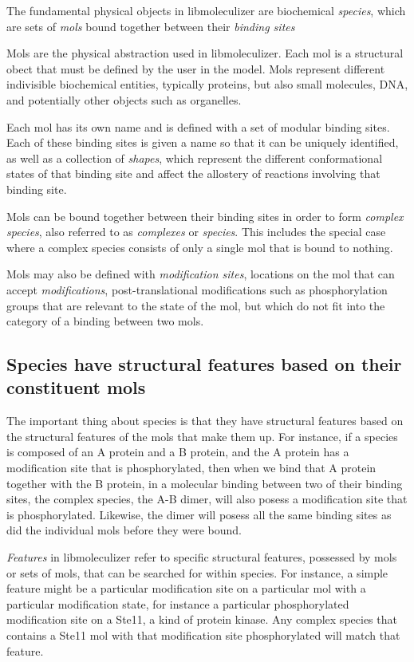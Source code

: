 The fundamental physical objects in libmoleculizer are biochemical
{\it species}, which are sets of {\it mols} bound together between
their {\it binding sites}

Mols are the physical abstraction used in libmoleculizer.  Each mol is
a structural obect that must be defined by the user in the model. Mols
represent different indivisible biochemical entities, typically
proteins, but also small molecules, DNA, and potentially other objects
such as organelles. 

Each mol has its own name and is defined with a set of modular binding
sites.  Each of these binding sites is given a name so that it can
be uniquely identified, as well as a collection of {\it shapes}, which
represent the different conformational states of that binding site and
affect the allostery of reactions involving that binding site.

Mols can be bound together between their binding sites in order to
form {\it complex species}, also referred to as {\it complexes} or
{\it species}.  This includes the special case where a complex species
consists of only a single mol that is bound to nothing.  

Mols may also be defined with {\it modification sites}, locations on
the mol that can accept {\it modifications}, post-translational
modifications such as phosphorylation groups that are relevant to the
state of the mol, but which do not fit into the category of a binding
between two mols.  

\subsection{Species have  structural features based on their
  constituent mols}

The important thing about species is that they have structural
features based on the structural features of the mols that make them
up.  For instance, if a species is composed of an A protein and a B
protein, and the A protein has a modification site that is
phosphorylated, then when we bind that A protein together with the B
protein, in a molecular binding between two of their binding sites,
the complex species, the A-B dimer, will also posess a modification
site that is phosphorylated. Likewise, the dimer will posess all the
same binding sites as did the individual mols before they were bound.  

{\it Features} in libmoleculizer refer to specific structural
features, possessed by mols or sets of mols, that can be searched for
within species.  For instance, a simple feature might be a
particular modification site on a particular mol with a particular
modification state, for instance a particular phosphorylated
modification site on a Ste11, a kind of protein kinase.  Any complex
species that contains a Ste11 mol with that modification site
phosphorylated will match that feature.


